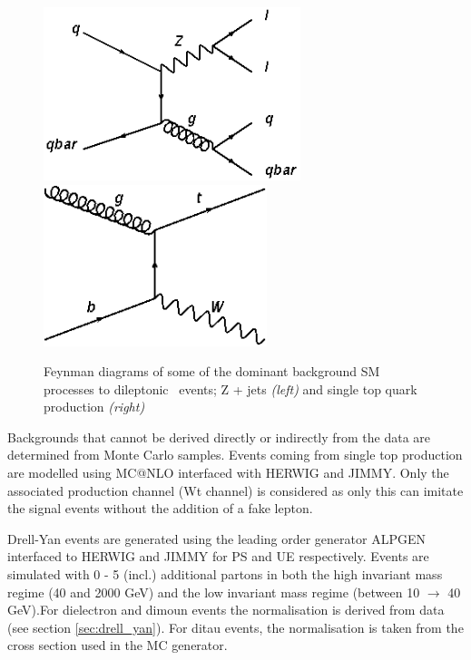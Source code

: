 \begin{figure}[htbp!]
\begin{center}
\includegraphics[width=75mm]{f/Z_jets}
\includegraphics[width=65mm]{f/single_top_Wt}
\end{center}
\caption{Feynman diagrams of some of the dominant background SM processes to dileptonic \ttbar\ events; Z + jets \emph{(left)} and single top quark production \emph{(right)}}
\label{fig:background_feynman}
\end{figure}


Backgrounds that cannot be derived directly or indirectly from the data are determined from Monte Carlo samples. Events coming from single top production are modelled using MC@NLO interfaced with HERWIG and JIMMY. Only the associated production channel (Wt channel) is considered as only this can imitate the signal events without the addition of a fake lepton. 

Drell-Yan events are generated using the leading order generator ALPGEN interfaced to HERWIG and JIMMY for PS and UE respectively. Events are simulated with 0 - 5 (incl.) additional partons in both the high invariant mass regime (40 and 2000 GeV) and the low invariant mass regime (between 10 $\rightarrow$ 40 GeV).For dielectron and dimoun events the normalisation is derived from data (see section \ref{sec:drell_yan}). For ditau events, the normalisation is taken from the cross section used in the MC generator.

